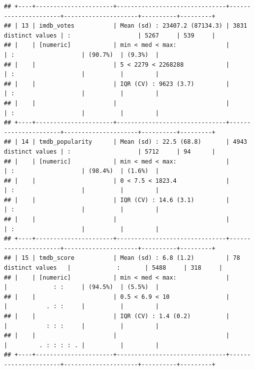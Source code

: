 \documentclass[11pt,preprint]{elsarticle}
\numberwithin{equation}{section}
\numberwithin{figure}{section}
\numberwithin{table}{section}
\begin{document}
\begin{verbatim}
## +----+----------------------+-------------------------------+----------------------+---------------------+----------+---------+
## | 13 | imdb_votes           | Mean (sd) : 23407.2 (87134.3) | 3831 distinct values | :                   | 5267     | 539     |
## |    | [numeric]            | min < med < max:              |                      | :                   | (90.7%)  | (9.3%)  |
## |    |                      | 5 < 2279 < 2268288            |                      | :                   |          |         |
## |    |                      | IQR (CV) : 9623 (3.7)         |                      | :                   |          |         |
## |    |                      |                               |                      | :                   |          |         |
## +----+----------------------+-------------------------------+----------------------+---------------------+----------+---------+
## | 14 | tmdb_popularity      | Mean (sd) : 22.5 (68.8)       | 4943 distinct values | :                   | 5712     | 94      |
## |    | [numeric]            | min < med < max:              |                      | :                   | (98.4%)  | (1.6%)  |
## |    |                      | 0 < 7.5 < 1823.4              |                      | :                   |          |         |
## |    |                      | IQR (CV) : 14.6 (3.1)         |                      | :                   |          |         |
## |    |                      |                               |                      | :                   |          |         |
## +----+----------------------+-------------------------------+----------------------+---------------------+----------+---------+
## | 15 | tmdb_score           | Mean (sd) : 6.8 (1.2)         | 78 distinct values   |             :       | 5488     | 318     |
## |    | [numeric]            | min < med < max:              |                      |             : :     | (94.5%)  | (5.5%)  |
## |    |                      | 0.5 < 6.9 < 10                |                      |           . : :     |          |         |
## |    |                      | IQR (CV) : 1.4 (0.2)          |                      |           : : :     |          |         |
## |    |                      |                               |                      |         . : : : : . |          |         |
## +----+----------------------+-------------------------------+----------------------+---------------------+----------+---------+
\end{verbatim}

\begin{Shaded}
\begin{Highlighting}[]
\OtherTok{\textless{}{-}}  \NormalTok{, } \NormalTok{)}
\end{Highlighting}
\end{Shaded}
\end{document}

